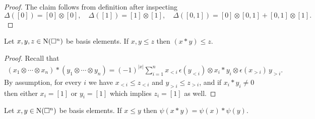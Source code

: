 \begin{proof}
	The claim follows from definition after inspecting
	\begin{equation*}
	\Delta([0]) = [0] \otimes [0], \quad \Delta([1]) = [1] \otimes [1], \quad \Delta([0, 1]) = [0] \otimes [0, 1] + [0, 1] \otimes [1].
	\end{equation*}
\end{proof}

\begin{lemma}
	Let $x, y, z \in \operatorname{N}(\square^n)$ be basis elements.
	If $x, y \leq z$ then $(x \ast y) \leq z$.
\end{lemma}

\begin{proof}
	Recall that
	\begin{align*}
	(x_1 \otimes \cdots \otimes x_n) \ast (y_1 \otimes \cdots \otimes y_n) =
	(-1)^{|x|} \sum_{i=1}^n x_{<i}\, \epsilon(y_{<i}) \otimes x_i \ast y_i \otimes \epsilon(x_{>i}) \, y_{>i}.
	\end{align*}
	By assumption, for every $i$ we have $x_{<i} \leq z_{<i}$ and $y_{>i} \leq z_{>i}$, and if $x_i \ast y_i \neq 0$ then either $x_i = [1]$ or $y_i = [1]$ which implies $z_i = [1]$ as well.
\end{proof}

\begin{lemma}
	Let $x, y \in \operatorname{N}(\square^n)$ be basis elements.
	If $x \leq y$ then $\psi(x \ast y) = \psi(x) \ast \psi(y)$.
\end{lemma}

